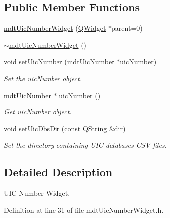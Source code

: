 \subsection*{Public Member Functions}
\begin{DoxyCompactItemize}
\item 
\hyperlink{classmdt_uic_number_widget_a1742d3d2c2f697098a8ecc7b2c87d644}{mdt\-Uic\-Number\-Widget} (\hyperlink{class_q_widget}{Q\-Widget} $\ast$parent=0)
\item 
\hyperlink{classmdt_uic_number_widget_a2b722df11631e5311b51d09ce6e5dbe8}{$\sim$mdt\-Uic\-Number\-Widget} ()
\item 
void \hyperlink{classmdt_uic_number_widget_a8555bdd4ce7050ef9a516d33625200e0}{set\-Uic\-Number} (\hyperlink{classmdt_uic_number}{mdt\-Uic\-Number} $\ast$\hyperlink{classmdt_uic_number_widget_a3d2d6790e043f48d59a63eef7341fd99}{uic\-Number})
\begin{DoxyCompactList}\small\item\em Set the uic\-Number object. \end{DoxyCompactList}\item 
\hyperlink{classmdt_uic_number}{mdt\-Uic\-Number} $\ast$ \hyperlink{classmdt_uic_number_widget_a3d2d6790e043f48d59a63eef7341fd99}{uic\-Number} ()
\begin{DoxyCompactList}\small\item\em Get uic\-Number object. \end{DoxyCompactList}\item 
void \hyperlink{classmdt_uic_number_widget_a1ca77bc9c81ba3aa8ad4205186b05114}{set\-Uic\-Dbs\-Dir} (const Q\-String \&dir)
\begin{DoxyCompactList}\small\item\em Set the directory containing U\-I\-C databases C\-S\-V files. \end{DoxyCompactList}\end{DoxyCompactItemize}


\subsection{Detailed Description}
U\-I\-C Number Widget. 

Definition at line 31 of file mdt\-Uic\-Number\-Widget.\-h.



